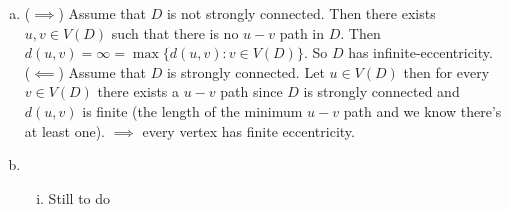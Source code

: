 \begin{enumerate}[a.]
    \item ($\implies$) Assume that $D$ is not strongly connected. Then there exists $u, v \in V(D)$ such that there is no $u-v$ path in $D$. Then $d(u, v) = \infty = \max\{d(u, v) : v \in V(D)\}$. So $D$ has infinite-eccentricity. \\
    ($\impliedby$) Assume that $D$ is strongly connected. Let $u \in V(D)$ then for every $v \in V(D)$ there exists a $u-v$ path since $D$ is strongly connected and $d(u, v)$ is finite (the length of the minimum $u-v$ path and we know there's at least one). $\implies$ every vertex has finite eccentricity. 
    \item 
        \begin{enumerate}[(i)]
            \item Still to do
        \end{enumerate}
\end{enumerate}
